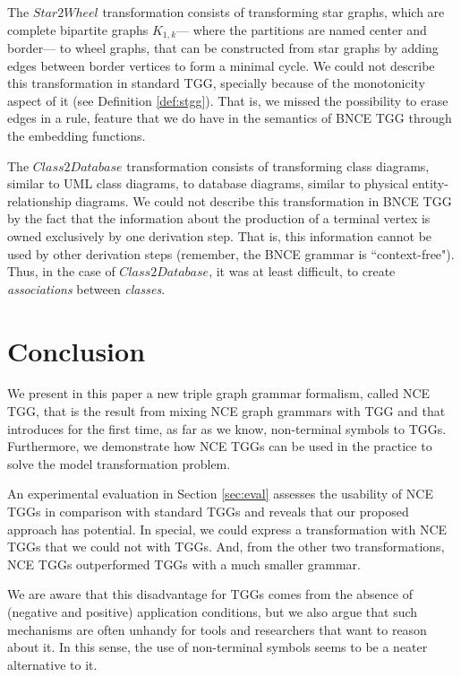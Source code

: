 \documentclass[runningheads]{llncs}
\begin{document}
The $Star2Wheel$ transformation consists of transforming star graphs, which are complete bipartite graphs $K_{1,k}$--- where the partitions are named center and border--- to wheel graphs, that can be constructed from star graphs by adding edges between border vertices to form a minimal cycle. We could not describe this transformation in standard TGG, specially because of the monotonicity aspect of it (see Definition \ref{def:stgg}). That is, we missed the possibility to erase edges in a rule, feature that we do have in the semantics of BNCE TGG through the embedding functions.

The $Class2Database$ transformation consists of transforming class diagrams, similar to UML class diagrams, to database diagrams, similar to physical entity-relationship diagrams. We could not describe this transformation in BNCE TGG by the fact that the information about the production of a terminal vertex is owned exclusively by one derivation step. That is, this information cannot be used by other derivation steps (remember, the BNCE grammar is ``context-free"). Thus, in the case of $Class2Database$, it was at least difficult, to create \textit{associations} between \textit{classes}.

\section{Conclusion}
\label{sec:conclusion}
We present in this paper a new triple graph grammar formalism, called NCE TGG, that is the result from mixing NCE graph grammars \cite{janssens1982graph} with TGG \cite{schurr1994specification} and that introduces for the first time, as far as we know, non-terminal symbols to TGGs. Furthermore, we demonstrate how NCE TGGs can be used in the practice to solve the model transformation problem.

An experimental evaluation in Section \ref{sec:eval} assesses the usability of NCE TGGs in comparison with standard TGGs and reveals that our proposed approach has potential. In special, we could express a transformation with NCE TGGs that we could not with TGGs. And, from the other two transformations, NCE TGGs outperformed TGGs with a much smaller grammar.

We are aware that this disadvantage for TGGs comes from the absence of (negative and positive) application conditions, but we also argue that such mechanisms are often unhandy for tools and researchers that want to reason about it. In this sense, the use of non-terminal symbols seems to be a neater alternative to it.
\end{document}
